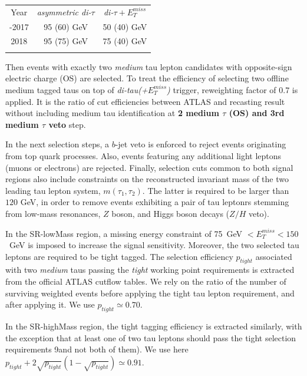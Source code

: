 \documentclass{ws-mpla}
\begin{document}
\begin{table}[t]
  {\begin{tabular}{@{}c c c@{}} \toprule
  Year & \textit{asymmetric di-$\tau$} & \textit{di-$\tau +E^{miss}_T$} \\
  \colrule
 2015-2017 & 95 (60) GeV & 50 (40) GeV \\
 2018 & 95 (75) GeV & 75 (40) GeV \\ 
  \botrule
  \end{tabular}\label{tab:trig-eff} }
\end{table}

Then events with exactly two \textit{medium} tau lepton candidates with opposite-sign electric charge (OS) are selected. To treat the efficiency of selecting two offline medium tagged taus on top of \textit{di-tau(+$E^{miss}_T$)} trigger, reweighting factor of 0.7 is applied. It is the ratio of cut efficiencies between ATLAS and recasting result without including medium tau identification at \textbf{2 medium $\tau$ (OS) and 3rd medium $\tau$ veto} step.

In the next selection steps, a $b$-jet veto is enforced to reject events originating from top quark processes.
Also, events featuring any additional light leptons (muons or electrons) are rejected.
Finally, selection cuts common to both signal regions also include constraints on the reconstructed invariant mass of the two leading tau lepton system, $m(\tau_1,\tau_2)$. The latter is required to be larger than $120$ GeV, in order to remove events exhibiting a pair of tau leptonrs stemming from low-mass resonances, $Z$ boson, and Higgs boson decays ($Z/H$ veto).

In the SR-lowMass region, a missing energy constraint of 75~GeV $< E^{miss}_T < 150$~GeV is imposed to increase the signal sensitivity. Moreover, the two selected tau leptons are required to be tight tagged.
The selection efficiency $p_{tight}$ associated with two {\it medium} taus passing the \textit{tight} working point requirements is extracted from the official ATLAS cutflow tables. We rely on the ratio of the number of surviving weighted events before applying the tight tau lepton requirement, and after applying it. We use $p_{tight}\simeq 0.70$.

In the SR-highMass region, the tight tagging efficiency is extracted similarly, with the exception that at least one of two tau leptons should pass the tight selection requirements 9and not both of them). We use here $p_{tight} + 2\sqrt{p_{tight}}(1-\sqrt{p_{tight}})\simeq 0.91$.
\end{document}
